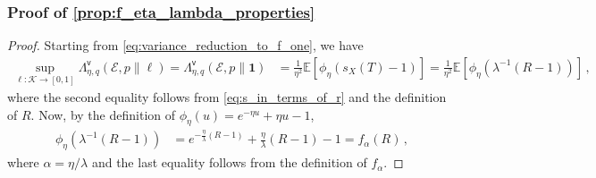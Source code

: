 \documentclass{article}
\theoremstyle{plain}
\theoremstyle{definition}
\theoremstyle{plain}
\newcommand{\E}{\mathbb E}
\newcommand{\K}{\mathcal K}
\newcommand{\cE}{\mathcal E}
\begin{document}
\subsubsection{Proof of \cref{prop:f_eta_lambda_properties}}
\label{proof:f_eta_lambda_properties}
\begin{proof}
    Starting from \cref{eq:variance_reduction_to_f_one}, we have
    \begin{align}
        \sup_{\ell: \K \to [0,1]}
        \Lambda^{\mathsf{v}}_{\eta, q}(\cE, p \| \ell)
        =
        \Lambda^{\mathsf{v}}_{\eta, q}(\cE, p \| \mathbf{1})
         & =
        \frac{1}{\eta^2}
        \E\left[
            \phi_\eta(s_X(T) - 1)
            \right]
        =
        \frac{1}{\eta^2}
        \E\left[
            \phi_\eta\left(
            \lambda^{-1}(R - 1)
            \right)
            \right]\,,
        \label{eq:appendix_f_eta_lambda_reduction}
    \end{align}
    where the second equality follows from \cref{eq:s_in_terms_of_r} and the definition of $R$.
    Now, by the definition of $\phi_\eta(u) = e^{-\eta u} + \eta u - 1$,
    \begin{align}
        \phi_\eta\left(
        \lambda^{-1}(R - 1)
        \right)
         & =
        e^{-\frac{\eta}{\lambda}(R - 1)}
        + \frac{\eta}{\lambda} (R - 1) - 1
        = f_{\alpha}(R)\,,
    \end{align}
    where $\alpha = \eta/\lambda$ and the last equality follows from the definition of $f_\alpha$.
\end{proof}
\end{document}
